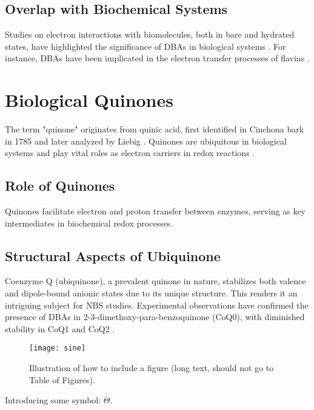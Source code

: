 \subsection{Overlap with Biochemical Systems}
Studies on electron interactions with biomolecules, both in bare and hydrated states, have highlighted the significance of DBAs in biological systems \cite{gu2012interactions}. For instance, DBAs have been implicated in the electron transfer processes of flavins \cite{matthews2018observation}.

\section{Biological Quinones}
The term "quinone" originates from quinic acid, first identified in Cinchona bark in 1785 and later analyzed by Liebig \cite{chen2024low,rusell1873quinone}. Quinones are ubiquitous in biological systems and play vital roles as electron carriers in redox reactions \cite{ernster1995biochemical}.

\subsection{Role of Quinones}
Quinones facilitate electron and proton transfer between enzymes, serving as key intermediates in biochemical redox processes.

\subsection{Structural Aspects of Ubiquinone}
Coenzyme Q (ubiquinone), a prevalent quinone in nature, stabilizes both valence and dipole-bound anionic states due to its unique structure. This renders it an intriguing subject for NBS studies. Experimental observations have confirmed the presence of DBAs in 2-3-dimethoxy-para-benzoquinone (CoQ0), with diminished stability in CoQ1 and CoQ2 \cite{ameixa2023parent,west2014anion,pshenichnyuk2020ionizing,bull2015anion}.

\begin{figure}[th!]
  \centering
  \medskip
  \texttt{[image: sine]}
  \caption[Short caption for Table of Figures]{Illustration of how to
  include a figure (long text, should not go to Table of Figures).}
  \label{fig:sine}
\end{figure}

Introducing some symbol: $\Theta$.

